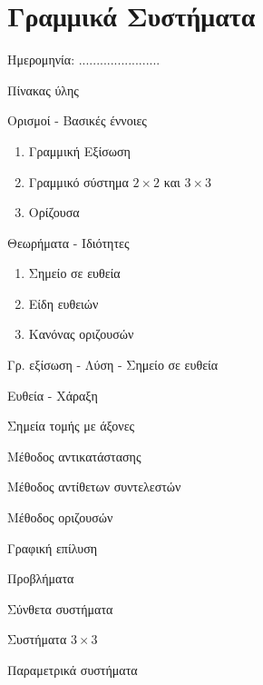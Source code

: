 \documentclass[twoside,nofonts,internet,math,spyros]{frontisthrio}
\newcommand{\myitem}{\stepcounter{enumi}\item[\raisebox{0.5mm}{\faExclamationTriangle}\ \Large$\square$]}
\begin{document}
\section{Γραμμικά Συστήματα}
\begin{flushright}
\faCalendar* Ημερομηνία: .......................
\end{flushright}
\begin{mybox}[mysubtitle]{Πίνακας ύλης}
\begin{tcbraster}[raster columns=2,raster equal height]
\begin{myleftbox}{Ορισμοί - Βασικές έννοιες\ \ \faBook}
\begin{enumerate}[itemsep=0mm]
\item Γραμμική Εξίσωση
\item Γραμμικό σύστημα $ 2\times 2 $ και $ 3\times 3 $
\item Ορίζουσα
\end{enumerate}
\end{myleftbox}
\begin{myrightbox}{Θεωρήματα - Ιδιότητες\ \ \faTools}
\begin{enumerate}[itemsep=0mm]
\item Σημείο σε ευθεία
\item Είδη ευθειών
\item Κανόνας οριζουσών
\end{enumerate}
\end{myrightbox}
\end{tcbraster}
\begin{multicols}{2}
\begin{todolist}[itemsep=0mm]
\item Γρ. εξίσωση - Λύση - Σημείο σε ευθεία
\item Ευθεία - Χάραξη
\item Σημεία τομής με άξονες
\myitem Μέθοδος αντικατάστασης
\myitem Μέθοδος αντίθετων συντελεστών
\myitem Μέθοδος οριζουσών
\item Γραφική επίλυση
\item Προβλήματα
\item Σύνθετα συστήματα
\item Συστήματα $ 3\times 3 $
\item Παραμετρικά συστήματα
\end{todolist}
\end{multicols}
\begin{multicols}{2}
\begin{enumerate}[itemsep=0mm]

\end{enumerate}
\end{multicols}
\end{mybox}
\end{document}
